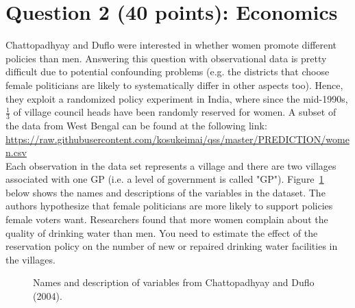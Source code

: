 \documentclass[12pt,letterpaper]{article}
\begin{document}



\newpage
\section*{Question 2 (40 points): Economics}
Chattopadhyay and Duflo were interested in whether women promote different policies than men. Answering this question with observational data is pretty difficult due to potential confounding problems (e.g. the districts that choose female politicians are likely to systematically differ in other aspects too). Hence, they exploit a randomized policy experiment in India, where since the mid-1990s, $\frac{1}{3}$ of village council heads have been randomly reserved for women. A subset of the data from West Bengal can be found at the following link: \url{https://raw.githubusercontent.com/kosukeimai/qss/master/PREDICTION/women.csv}\\
\noindent Each observation in the data set represents a village and there are two villages associated with one GP (i.e. a level of government is called "GP"). Figure~\ref{fig:women_desc} below shows the names and descriptions of the variables in the dataset. The authors hypothesize that female politicians are more likely to support policies female voters want. Researchers found that more women complain about the quality of drinking water than men. You need to estimate the effect of the reservation policy on the number of new or repaired drinking water facilities in the villages.
\vspace{.5cm}
\begin{figure}[h!]
	\caption{\footnotesize{Names and description of variables from Chattopadhyay and Duflo (2004).}}
	\vspace{.5cm}
	\centering
	\label{fig:women_desc}

\end{figure}		
\end{document}
